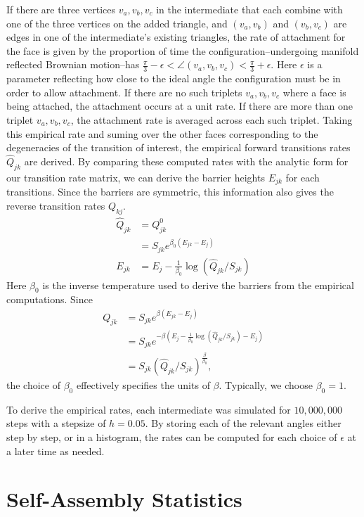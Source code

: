 If there are three vertices $v_a, v_b, v_c$ in the intermediate that each combine with one of the three vertices on the added triangle, and $(v_a, v_b)$ and $(v_b, v_c)$ are edges in one of the intermediate's existing triangles, the rate of attachment for the face is given by the proportion of time the configuration--undergoing manifold reflected Brownian motion--has $\frac{\pi}{3} - \epsilon < \angle( v_a, v_b, v_c) < \frac{\pi}{3} + \epsilon$. Here $\epsilon$ is a parameter reflecting how close to the ideal angle the configuration must be in order to allow attachment. If there are no such triplets $v_a, v_b, v_c$ where a face is being attached, the attachment occurs at a unit rate. If there are more than one triplet $v_a, v_b, v_c$, the attachment rate is averaged across each such triplet. Taking this empirical rate and suming over the other faces corresponding to the degeneracies of the transition of interest, the empirical forward transitions rates $\hat{Q}_{jk}$ are derived. By comparing these computed rates with the analytic form for our transition rate matrix, we can derive the barrier heights $E_{jk}$ for each transitions. Since the barriers are symmetric, this information also gives the reverse transition rates $Q_{kj}$.
\begin{align}
\hat{Q}_{jk} &= Q^0_{jk} \\
	&= S_{jk}e^{\beta_0(E_{jk} - E_j)} \\
E_{jk} &= E_j-\frac{1}{\beta_0}\log\left(\hat{Q}_{jk}/S_{jk}\right)
\end{align}
Here $\beta_0$ is the inverse temperature used to derive the barriers from the empirical computations. Since 
\begin{align}
Q_{jk} 	&= S_{jk}e^{\beta(E_{jk} - E_j)} \\
 &= S_{jk} e^{-\beta\left(E_j-\frac{1}{\beta_0}\log\left(\hat{Q}_{jk}/S_{jk}\right) - E_j\right)} \\
 &= S_{jk}\left(\hat{Q}_{jk}/S_{jk}\right)^{\frac{\beta}{\beta_0}},
\end{align}
the choice of $\beta_0$ effectively specifies the units of $\beta$. Typically, we choose $\beta_0 = 1$.

To derive the empirical rates, each intermediate was simulated for $10,000,000$ steps with a stepsize of $h = 0.05$. By storing each of the relevant angles either step by step, or in a histogram, the rates can be computed for each choice of $\epsilon$ at a later time as needed.

\section{Self-Assembly Statistics}

